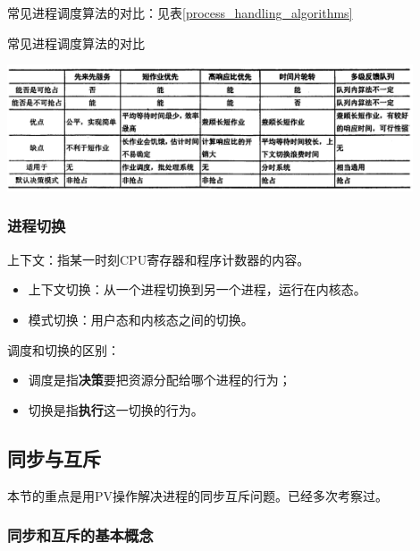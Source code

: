 \documentclass[12pt, a4paper, oneside]{ctexart}
\begin{document}
常见进程调度算法的对比：见表\ref{process_handling_algorithms}

\begin{table}
  \centering
  \caption{常见进程调度算法的对比}
  \label{process_handling_algorithms}
  \includegraphics[width=0.9\textwidth]{./images/process_handling_algorithms.png}
\end{table}

\subsubsection{进程切换}

上下文：指某一时刻CPU寄存器和程序计数器的内容。

\begin{itemize}
  \item 上下文切换：从一个进程切换到另一个进程，运行在内核态。
  \item 模式切换：用户态和内核态之间的切换。
\end{itemize}

调度和切换的区别：
\begin{itemize}
  \item 调度是指\textbf{决策}要把资源分配给哪个进程的行为；
  \item 切换是指\textbf{执行}这一切换的行为。
\end{itemize}

\subsection{同步与互斥}

本节的重点是用PV操作解决进程的同步互斥问题。已经多次考察过。

\subsubsection{同步和互斥的基本概念}
\end{document}

